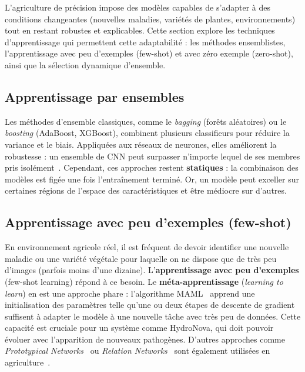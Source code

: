 L’agriculture de précision impose des modèles capables de s’adapter à des conditions changeantes (nouvelles maladies, variétés de plantes, environnements) tout en restant robustes et explicables. Cette section explore les techniques d’apprentissage qui permettent cette adaptabilité : les méthodes ensemblistes, l’apprentissage avec peu d’exemples (few-shot) et avec zéro exemple (zero-shot), ainsi que la sélection dynamique d’ensemble.

\subsection{Apprentissage par ensembles}
Les méthodes d’ensemble classiques, comme le \textit{bagging} (forêts aléatoires) ou le \textit{boosting} (AdaBoost, XGBoost), combinent plusieurs classifieurs pour réduire la variance et le biais. Appliquées aux réseaux de neurones, elles améliorent la robustesse : un ensemble de CNN peut surpasser n’importe lequel de ses membres pris isolément~\cite{dietterich2000ensemble}. Cependant, ces approches restent \textbf{statiques} : la combinaison des modèles est figée une fois l’entraînement terminé. Or, un modèle peut exceller sur certaines régions de l’espace des caractéristiques et être médiocre sur d’autres.

\subsection{Apprentissage avec peu d’exemples (few-shot)}
En environnement agricole réel, il est fréquent de devoir identifier une nouvelle maladie ou une variété végétale pour laquelle on ne dispose que de très peu d’images (parfois moins d’une dizaine). L’\textbf{apprentissage avec peu d’exemples} (few-shot learning) répond à ce besoin. Le \textbf{méta-apprentissage} (\textit{learning to learn}) en est une approche phare : l’algorithme MAML~\cite{finn2017model} apprend une initialisation des paramètres telle qu’une ou deux étapes de descente de gradient suffisent à adapter le modèle à une nouvelle tâche avec très peu de données. Cette capacité est cruciale pour un système comme HydroNova, qui doit pouvoir évoluer avec l’apparition de nouveaux pathogènes. D'autres approches comme \textit{Prototypical Networks}~\cite{snell2017prototypical} ou \textit{Relation Networks}~\cite{sung2018learning} sont également utilisées en agriculture~\cite{arguello2020few}.

